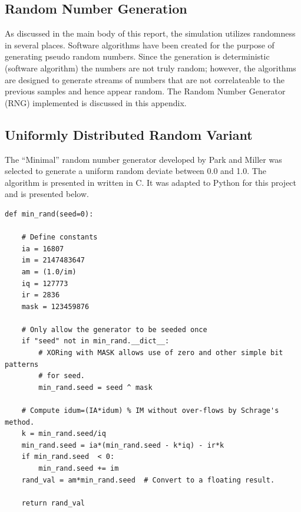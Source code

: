 \documentclass[paper=a4, fontsize=11pt]{scrartcl}
\numberwithin{equation}{section}		%
\numberwithin{figure}{section}			%
\numberwithin{table}{section}		    %
\begin{document}
\begin{appendices}
\newpage
\section{Random Number Generation}\label{sec:A:rng}
As discussed in the main body of this report, the simulation utilizes randomness 
in several places.
Software algorithms have been created for the purpose of generating pseudo random numbers. 
Since the generation is deterministic (software algorithm) the numbers are not truly 
random; however, the algorithms are designed to generate streams of numbers that are not 
correlateable to the previous samples and hence appear random. The Random Number Generator 
(RNG) implemented is discussed in this appendix.

\subsection{Uniformly Distributed Random Variant}\label{sec:A:rng:uniformrng}
The ``Minimal'' random number generator developed by Park and Miller 
\cite{press1996numerical} was selected to generate a uniform random deviate between 0.0 and 
1.0. The algorithm is presented in \cite{press1996numerical} written in C. It was adapted 
to Python for this project and is presented below.\\

\lstset{language=Python}
\begin{lstlisting}[frame=single, label=some-code, caption=Minimal Random Number Generator]
def min_rand(seed=0):

    # Define constants
    ia = 16807
    im = 2147483647
    am = (1.0/im)
    iq = 127773
    ir = 2836
    mask = 123459876
	
    # Only allow the generator to be seeded once
    if "seed" not in min_rand.__dict__:
        # XORing with MASK allows use of zero and other simple bit patterns
        # for seed.
        min_rand.seed = seed ^ mask

    # Compute idum=(IA*idum) % IM without over-flows by Schrage's method.
    k = min_rand.seed/iq
    min_rand.seed = ia*(min_rand.seed - k*iq) - ir*k
    if min_rand.seed  < 0:
        min_rand.seed += im
    rand_val = am*min_rand.seed  # Convert to a floating result.
    
    return rand_val
\end{lstlisting}
\vspace{2mm}


\end{appendices}
\end{document}
